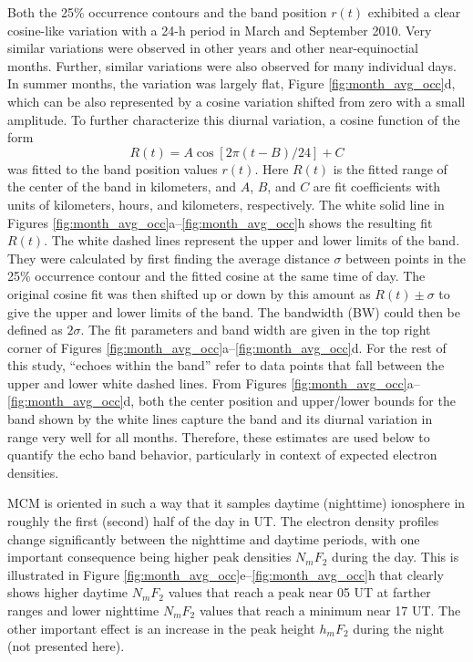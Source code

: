 Both the 25\% occurrence contours and the band position \(r(t)\) exhibited a clear cosine-like variation with a 24-h period in March and September 2010.  Very similar variations were observed in other years and other near-equinoctial months.  Further, similar variations were also observed for many individual days.  In summer months, the variation was largely flat, Figure \ref{fig:month_avg_occ}d, which can be also represented by a cosine variation shifted from zero with a small amplitude.  To further characterize this diurnal variation, a cosine function of the form
\begin{equation}\label{eqn:band}
R\left(t\right) = A \cos\left[2\pi\left(t-B\right)/24\right] + C
\end{equation}
was fitted to the band position values \(r(t)\). Here \(R(t)\) is the fitted range of the center of the band in kilometers, and  \(A\), \(B\), and \(C\) are fit coefficients with units of kilometers, hours, and kilometers, respectively. The white solid line in Figures \ref{fig:month_avg_occ}a--\ref{fig:month_avg_occ}h shows the resulting fit \(R\left(t\right)\). The white dashed lines represent the upper and lower limits of the band.  They were calculated by first finding the average distance \(\sigma\) between points in the 25\% occurrence contour and the fitted cosine at the same time of day. The original cosine fit was then shifted up or down by this amount as \(R\left(t\right) \pm \sigma\) to give the upper and lower limits of the band.  The bandwidth (BW) could then be defined as \(2\sigma\).  The fit parameters and band width are given in the top right corner of Figures \ref{fig:month_avg_occ}a--\ref{fig:month_avg_occ}d. For the rest of this study, ``echoes within the band'' refer to data points that fall between the upper and lower white dashed lines. From Figures \ref{fig:month_avg_occ}a--\ref{fig:month_avg_occ}d, both the center position and upper/lower bounds for the band shown by the white lines capture the band and its diurnal variation in range very well for all months. Therefore, these estimates are used below to quantify the echo band behavior, particularly in context of expected electron densities.

MCM is oriented in such a way that it samples daytime (nighttime) ionosphere in roughly the first (second) half of the day in UT. The electron density profiles change significantly between the nighttime and daytime periods, with one important consequence being higher peak densities \(N_mF_2\) during the day.  This is illustrated in Figure \ref{fig:month_avg_occ}e--\ref{fig:month_avg_occ}h that clearly shows higher daytime \(N_mF_2\) values that reach a peak near 05 UT at farther ranges and lower nighttime \(N_mF_2\) values that reach a minimum near 17 UT.  The other important effect is an increase in the peak height \(h_mF_2\) during the night (not presented here).

